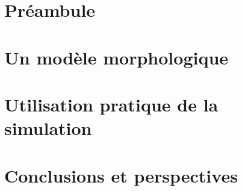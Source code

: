 \documentclass[ twoside,openright,titlepage,numbers=noenddot,headinclude,%
                footinclude=true,cleardoublepage=empty,abstractoff, %
                BCOR=5mm,paper=a4,fontsize=11pt,%
                francais ,ngerman,american%
                ]{scrreprt}
\begin{document}
\frenchspacing
\raggedbottom
{} %
\renewcommand*{\bibname}{Bibliographie}
\pagestyle{plain}

%


\cleardoublepage
\cleardoublepage
\cleardoublepage
\cleardoublepage
\pagestyle{scrheadings}
\cleardoublepage

\cleardoublepage{}

\cleardoublepage
\part{Préambule \label{part:preamb}}


\cleardoublepage
\part{Un modèle morphologique \label{part:model}}



\cleardoublepage
\part{Utilisation pratique de la simulation \label{part:simu}}



\cleardoublepage
\part{Conclusions et perspectives \label{part:conc}}


% 
% 
% 
% 
\end{document}
